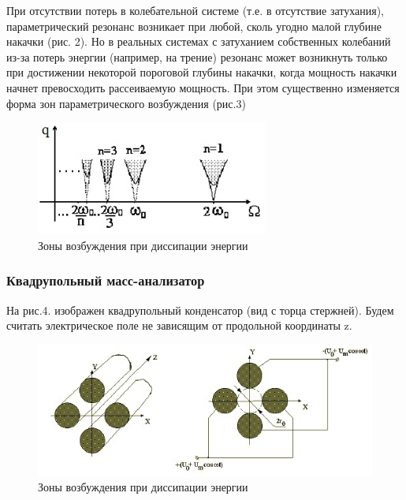 \documentclass[a4paper,12pt]{article}
\begin{document}
При отсутствии потерь в колебательной системе (т.е. в отсутствие затухания),  параметрический резонанс возникает при любой, сколь угодно малой глубине накачки (рис. 2). Но в   реальных системах с затуханием собственных колебаний из-за потерь энергии (например, на трение)  резонанс может возникнуть только при достижении  некоторой пороговой глубины накачки, когда мощность накачки  начнет превосходить рассеиваемую мощность.  При этом существенно изменяется форма зон параметрического  возбуждения (рис.3)

\begin{figure}[h!]
	\begin{center}
	\includegraphics[scale=0.8]{fig3}
\caption{Зоны возбуждения при диссипации энергии}
	\end{center}
\end{figure}

\subsubsection*{Квадрупольный масс-анализатор}

На рис.4. изображен квадрупольный конденсатор (вид с торца стержней). Будем считать электрическое поле не зависящим от продольной координаты z.

\begin{figure}[h!]
	\begin{center}
	\includegraphics[scale=0.5]{fig4}
\caption{Зоны возбуждения при диссипации энергии}
	\end{center}
\end{figure}
\end{document}
